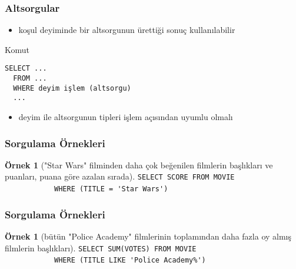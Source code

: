 \documentclass[dvipsnames]{beamer}
\theoremstyle{definition}
\theoremstyle{example}
\newtheorem{ornek}[theorem]{Örnek}
\theoremstyle{plain}
\begin{document}
\begin{frame}[fragile]
  \frametitle{Altsorgular}

  \begin{itemize}
    \item koşul deyiminde bir altsorgunun ürettiği sonuç kullanılabilir
  \end{itemize}

  \begin{block}{Komut}
    \begin{lstlisting}
SELECT ...
  FROM ...
  WHERE deyim işlem (altsorgu)
  ...
    \end{lstlisting}
  \end{block}

  \pause
  \begin{itemize}
    \item deyim ile altsorgunun tipleri işlem açısından uyumlu olmalı
  \end{itemize}
\end{frame}

\begin{frame}[fragile]
  \frametitle{Sorgulama Örnekleri}

  \begin{ornek}["Star Wars" filminden daha çok beğenilen filmlerin başlıkları ve
                puanları, puana göre azalan sırada]
\lstinline!SELECT SCORE FROM MOVIE!\\
~~~~~~~~~~~~\lstinline!WHERE (TITLE = 'Star Wars')!
  \end{ornek}
\end{frame}

\begin{frame}[fragile]
  \frametitle{Sorgulama Örnekleri}

  \begin{ornek}[bütün "Police Academy" filmlerinin toplamından daha fazla oy
                almış filmlerin başlıkları]
\lstinline!SELECT SUM(VOTES) FROM MOVIE!\\
~~~~~~~~~~~~\lstinline!WHERE (TITLE LIKE 'Police Academy%')!
  \end{ornek}
\end{frame}
\end{document}
